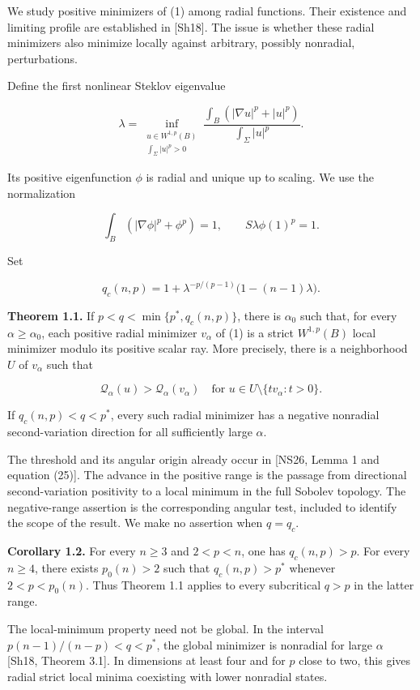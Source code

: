 \documentclass[11pt]{article}
\begin{document}
We study positive minimizers of (1) among radial functions. Their
existence and limiting profile are established in {[}Sh18{]}. The issue
is whether these radial minimizers also minimize locally against
arbitrary, possibly nonradial, perturbations.

Define the first nonlinear Steklov eigenvalue

\[
\lambda=\inf_{\substack{u\in W^{1,p}(B)\\ \int_\Sigma|u|^p>0}}
\frac{\int_B(|\nabla u|^p+|u|^p)}{\int_\Sigma|u|^p}.
\tag{3}
\]

Its positive eigenfunction \(\phi\) is radial and unique up to scaling.
We use the normalization

\[
\int_B(|\nabla\phi|^p+\phi^p)=1,
\qquad S\lambda\phi(1)^p=1.
\tag{4}
\]

Set

\[
q_c(n,p)=1+\lambda^{-p/(p-1)}\bigl(1-(n-1)\lambda\bigr).
\tag{5}
\]

\textbf{Theorem 1.1.} If \(p<q<\min\{p^*,q_c(n,p)\}\), there is
\(\alpha_0\) such that, for every \(\alpha\ge\alpha_0\), each positive
radial minimizer \(v_\alpha\) of (1) is a strict \(W^{1,p}(B)\) local
minimizer modulo its positive scalar ray. More precisely, there is a
neighborhood \(U\) of \(v_\alpha\) such that

\[
\mathcal Q_\alpha(u)>\mathcal Q_\alpha(v_\alpha)
\quad\text{for }u\in U\setminus\{t v_\alpha:t>0\}.
\tag{6}
\]

If \(q_c(n,p)<q<p^*\), every such radial minimizer has a negative
nonradial second-variation direction for all sufficiently large
\(\alpha\).

The threshold and its angular origin already occur in {[}NS26, Lemma 1
and equation (25){]}. The advance in the positive range is the passage
from directional second-variation positivity to a local minimum in the
full Sobolev topology. The negative-range assertion is the corresponding
angular test, included to identify the scope of the result. We make no
assertion when \(q=q_c\).

\textbf{Corollary 1.2.} For every \(n\ge3\) and \(2<p<n\), one has
\(q_c(n,p)>p\). For every \(n\ge4\), there exists \(p_0(n)>2\) such that
\(q_c(n,p)>p^*\) whenever \(2<p<p_0(n)\). Thus Theorem 1.1 applies to
every subcritical \(q>p\) in the latter range.

The local-minimum property need not be global. In the interval
\(p(n-1)/(n-p)<q<p^*\), the global minimizer is nonradial for large
\(\alpha\) {[}Sh18, Theorem 3.1{]}. In dimensions at least four and for
\(p\) close to two, this gives radial strict local minima coexisting
with lower nonradial states.
\end{document}
